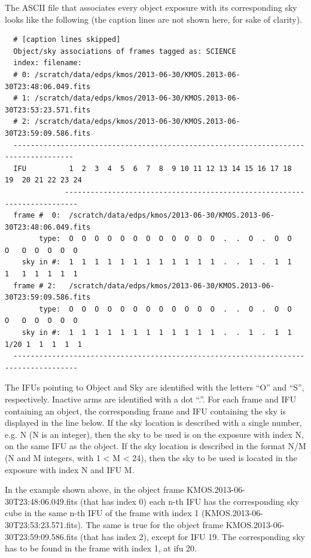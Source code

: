 The ASCII file that associates every object exposure with its corresponding sky looks like the following (the
caption lines are not shown here, for sake of clarity).

\begin{scriptsize}
\begin{verbatim}
  # [caption lines skipped]
  Object/sky associations of frames tagged as: SCIENCE
  index: filename:
  # 0: /scratch/data/edps/kmos/2013-06-30/KMOS.2013-06-30T23:48:06.049.fits
  # 1: /scratch/data/edps/kmos/2013-06-30/KMOS.2013-06-30T23:53:23.571.fits
  # 2: /scratch/data/edps/kmos/2013-06-30/KMOS.2013-06-30T23:59:09.586.fits
  ------------------------------------------------------------------------------------
  IFU          1  2  3  4  5  6  7  8  9 10 11 12 13 14 15 16 17 18  19  20 21 22 23 24
              -------------------------------------------------------------------------
  frame #  0:  /scratch/data/edps/kmos/2013-06-30/KMOS.2013-06-30T23:48:06.049.fits
        type:  O  O  O  O  O  O  O  O  O  O  O  O  .  .  O  .  O  O   O   O  O  O  O  O
    sky in #:  1  1  1  1  1  1  1  1  1  1  1  1  .  .  1  .  1  1   1   1  1  1  1  1
  frame # 2:   /scratch/data/edps/kmos/2013-06-30/KMOS.2013-06-30T23:59:09.586.fits
        type:  O  O  O  O  O  O  O  O  O  O  O  O  .  .  O  .  O  O   O   O  O  O  O  O
    sky in #:  1  1  1  1  1  1  1  1  1  1  1  1  .  .  1  .  1  1  1/20 1  1  1  1  1
  -------------------------------------------------------------------------------------
\end{verbatim}
\end{scriptsize}
The IFUs pointing to Object and Sky are identified with the letters “O” and “S”, respectively. Inactive arms
are identified with a dot “.”. For each frame and IFU containing an object, the corresponding frame and IFU
containing the sky is displayed in the line below. If the sky location is described with a single number, e.g. N
(N is an integer), then the sky to be used is on the exposure with index N, on the same IFU as the object.
If the sky location is described in the format N/M (N and M integers, with 1 < M < 24), then the sky to be
used is located in the exposure with index N and IFU M.

In the example shown above, in the object frame KMOS.2013-06-30T23:48:06.049.fits (that has index 0) each
n-th IFU has the corresponding sky cube in the same n-th IFU of the frame with index 1 
(KMOS.2013-06-30T23:53:23.571.fits).
The same is true for the object frame KMOS.2013-06-30T23:59:09.586.fits (that has index 2), 
except for IFU 19. The corresponding sky has to be found in the frame with index 1, at ifu 20.


